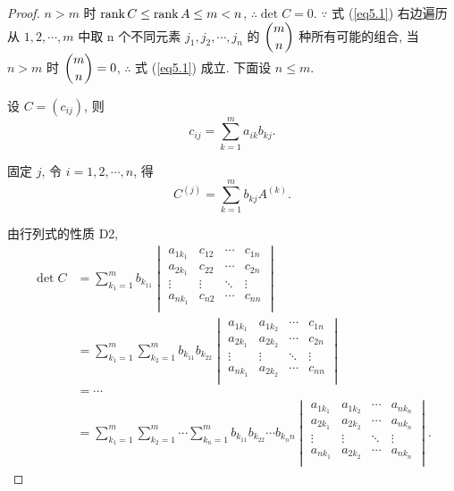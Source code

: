 \documentclass{ctexart}
\begin{document}
\begin{proof}    
    $n>m$ 时 $\operatorname{rank} C\leq\operatorname{rank} A\leq m<n$, $\therefore\det C=0$. $\because$ 式 (\ref{eq5.1}) 右边遍历从 $1,2,\cdots,m$ 中取 n 个不同元素 $j_1,j_2,\cdots,j_n$ 的 $\dbinom{m}{n}$ 种所有可能的组合, 当 $n>m$ 时 $\dbinom{m}{n}=0$, $\therefore$ 式 (\ref{eq5.1}) 成立. 下面设 $n\leq m$.
    
    设 $C=(c_{ij})$, 则
    \[c_{ij}=\sum_{k=1}^ma_{ik}b_{kj}.\]

    固定 $j$, 令 $i=1,2,\cdots,n$, 得
    \[C^{(j)}=\sum_{k=1}^mb_{kj}A^{(k)}.\]

    由行列式的性质 D2,
    \begin{align*}
        \det C & =\sum_{k_1=1}^mb_{k_11}\begin{vmatrix}
            a_{1k_1} & c_{12} & \cdots & c_{1n} \\
            a_{2k_1} & c_{22} & \cdots & c_{2n} \\
            \vdots & \vdots & \ddots & \vdots \\
            a_{nk_1} & c_{n2} & \cdots & c_{nn} \\
        \end{vmatrix} \\
            & =\sum_{k_1=1}^m\sum_{k_2=1}^mb_{k_11}b_{k_22}\begin{vmatrix}
            a_{1k_1} & a_{1k_2} & \cdots & c_{1n} \\
            a_{2k_1} & a_{2k_2} & \cdots & c_{2n} \\
            \vdots & \vdots & \ddots & \vdots \\
            a_{nk_1} & a_{2k_2} & \cdots & c_{nn} \\
        \end{vmatrix} \\
            & =\cdots \\
            & =\sum_{k_1=1}^m\sum_{k_2=1}^m\cdots\sum_{k_n=1}^mb_{k_11}b_{k_22}\cdots b_{k_nn}\begin{vmatrix}
            a_{1k_1} & a_{1k_2} & \cdots & a_{nk_n} \\
            a_{2k_1} & a_{2k_2} & \cdots & a_{nk_n} \\
            \vdots & \vdots & \ddots & \vdots \\
            a_{nk_1} & a_{2k_2} & \cdots & a_{nk_n} \\
        \end{vmatrix}.
    \end{align*}


\end{proof}
\end{document}

